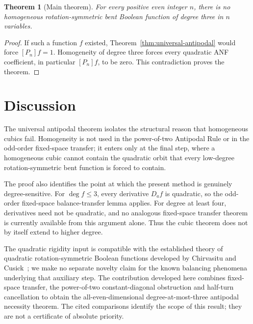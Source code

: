 \documentclass[11pt,a4paper]{article}
\newtheorem{theorem}{Theorem}[section]
\theoremstyle{remark}
\theoremstyle{plain}
\begin{document}
\begin{theorem}[Main theorem]\label{thm:global}
For every positive even integer $n$, there is no homogeneous rotation-symmetric bent Boolean function of degree three in $n$ variables.
\end{theorem}
\begin{proof}
If such a function $f$ existed, Theorem~\ref{thm:universal-antipodal} would force $[P_n]f=1$. Homogeneity of degree three forces every quadratic ANF coefficient, in particular $[P_n]f$, to be zero. This contradiction proves the theorem.
\end{proof}

\section{Discussion}
The universal antipodal theorem isolates the structural reason that homogeneous cubics fail. Homogeneity is not used in the power-of-two Antipodal Rule or in the odd-order fixed-space transfer; it enters only at the final step, where a homogeneous cubic cannot contain the quadratic orbit that every low-degree rotation-symmetric bent function is forced to contain.

The proof also identifies the point at which the present method is genuinely degree-sensitive. For $\deg f\le3$, every derivative $D_af$ is quadratic, so the odd-order fixed-space balance-transfer lemma applies. For degree at least four, derivatives need not be quadratic, and no analogous fixed-space transfer theorem is currently available from this argument alone. Thus the cubic theorem does not by itself extend to higher degree.

The quadratic rigidity input is compatible with the established theory of quadratic rotation-symmetric Boolean functions developed by Chirvasitu and Cusick~\cite{chircusick}; we make no separate novelty claim for the known balancing phenomena underlying that auxiliary step. The contribution developed here combines fixed-space transfer, the power-of-two constant-diagonal obstruction and half-turn cancellation to obtain the all-even-dimensional degree-at-most-three antipodal necessity theorem. The cited comparisons identify the scope of this result; they are not a certificate of absolute priority.
\end{document}
